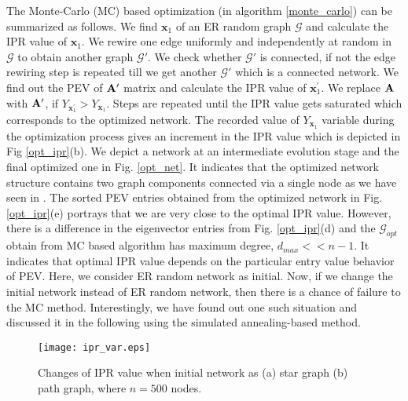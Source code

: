 \documentclass[envcountreset,oribibl]{llncs}
\begin{document}
The Monte-Carlo (MC) based optimization (in algorithm \ref{monte_carlo}) can be summarized as follows. We find ${\bm{x}_{1}}$ of an ER random graph $\mathcal{G}$ and calculate the IPR value of ${\bm{x}_1}$. We rewire one edge uniformly and independently at random in $\mathcal{G}$ to obtain another graph $\mathcal{G'}$. We check whether $\mathcal{G'}$ is connected, if not the edge rewiring step is repeated till we get another $\mathcal{G'}$ which is a connected network.  We find out the PEV of ${\bf A'}$ matrix and calculate the IPR value of ${\bm{x}_1^{'}}$. We replace ${\bf A}$ with ${\bf A'}$, if $Y_{\bm{x}^{'}_{1}} > Y_{\bm{x}_{1}}$. Steps are repeated until the IPR value gets saturated which corresponds to the optimized network. The recorded value of $Y_{\bm{x}_{1}}$ variable during the optimization process gives an increment in the IPR value which is depicted in Fig \ref{opt_ipr}(b). We depict a network at an intermediate evolution stage and the final optimized one in Fig. \ref{opt_net}. It indicates that the optimized network structure contains two graph components connected via a single node as we have seen in \cite{evec_localization_2017}. The sorted PEV entries obtained from the optimized network in Fig. \ref{opt_ipr}(e) portrays that we are very close to the optimal IPR value. However, there is a difference in the eigenvector entries from Fig. \ref{opt_ipr}(d) and the $\mathcal{G}_{opt}$ obtain from MC based algorithm has maximum degree, $d_{max}<<n-1$. It indicates that optimal IPR value depends on the particular entry value behavior of PEV. Here, we consider ER random network as initial. Now, if we change the initial network instead of ER random network, then there is a chance of failure to the MC method. Interestingly, we have found out one such situation and discussed it in the following using the simulated annealing-based method.
\begin{figure}[t]
\begin{center}
\texttt{[image: ipr\_var.eps]}
\caption{Changes of IPR value when initial network as (a) star graph (b) path graph, where $n=500$ nodes.}
\label{ipr_var}
\end{center}
\end{figure}
\end{document}
